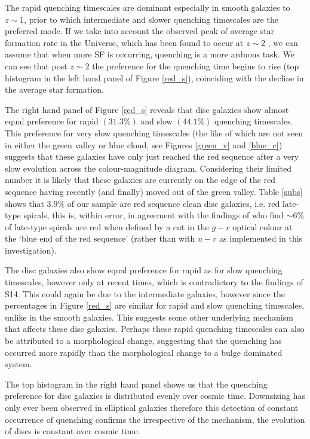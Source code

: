 \documentclass[useAMS,usenatbib]{mn2e}
\def\changed    {\color{titlecol} }
\begin{document}
{ \changed The rapid quenching timescales are dominant especially in smooth galaxies to $z \sim 1$, prior to which intermediate and slower quenching timescales are the preferred mode. If we take into account the observed peak of average star formation rate in the Universe, which has been found to occur at $z\sim2$ \citep{Hopkins04}, we can assume that when more SF is occurring, quenching is a more arduous task. We can see that post $z\sim2$ the preference for the quenching time begins to rise (top histogram in the left hand panel of Figure \ref{red_s}), coinciding with the decline in the average star formation.}



{\changed The right hand panel of Figure \ref{red_s} reveals that disc galaxies show almost equal preference for rapid $(31.3\%)$ and slow $(44.1\%)$ quenching timescales. This preference for very slow quenching timescales (the like of which are not seen in either the green valley or blue cloud, see Figures \ref{green_v} and \ref{blue_c})} suggests that these  galaxies have only just reached the red sequence after a very slow evolution across the colour-magnitude diagram. Considering their limited number it is likely that these galaxies are currently on the edge of the red sequence having recently (and finally) moved out of the green valley. Table \ref{subs} shows that $3.9\%$ of our sample are red sequence clean disc galaxies, i.e. red late-type spirals, this is, within error, in agreement with the findings of \citet{Masters10} who find $\sim6\%$ of late-type spirals are red when defined by a cut in the $g-r$ optical colour at the `blue end of the red sequence' (rather than with $u-r$ as implemented in this investigation).

{\changed The disc galaxies also show equal preference for rapid as for slow quenching timescales, however only at recent times, which is contradictory to the findings of S14. This could again be due to the intermediate galaxies, however since the percentages in Figure \ref{red_s} are similar for rapid and slow quenching timescales, unlike in the smooth galaxies. This suggests some other underlying mechanism that affects these disc galaxies. Perhaps these rapid quenching timescales can also be attributed to a morphological change, suggesting that the quenching has occurred more rapidly than the morphological change to a bulge dominated system.

The top histogram in the right hand panel shows us that the quenching preference for disc galaxies is distributed evenly over cosmic time. Downsizing has only ever been observed in elliptical galaxies \citep{Thomas10} therefore this detection of constant occurrence of quenching confirms the irrespective of the mechanism, the evolution of discs is constant over cosmic time.  }
\end{document}

